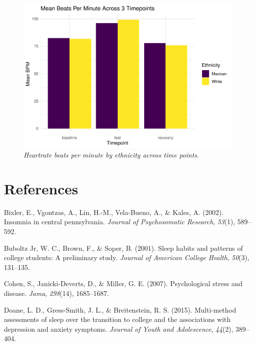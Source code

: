 \documentclass[
  man, fleqn, noextraspace]{apa6}
\begin{document}
\begin{figure}
\centering
\includegraphics{PAPAJA_Final_class_project_files/figure-latex/unnamed-chunk-3-1.pdf}
\caption{\label{fig:unnamed-chunk-3}\emph{Heartrate beats per minute by ethnicity across time points.}}
\end{figure}

\hypertarget{references}{%
\section{References}\label{references}}

\begingroup
\setlength{\parindent}{-0.5in}
\setlength{\leftskip}{0.5in}

\hypertarget{refs}{}
\leavevmode\hypertarget{ref-bixler2002insomnia}{}%
Bixler, E., Vgontzas, A., Lin, H.-M., Vela-Bueno, A., \& Kales, A. (2002). Insomnia in central pennsylvania. \emph{Journal of Psychosomatic Research}, \emph{53}(1), 589--592.

\leavevmode\hypertarget{ref-buboltz2001sleep}{}%
Buboltz Jr, W. C., Brown, F., \& Soper, B. (2001). Sleep habits and patterns of college students: A preliminary study. \emph{Journal of American College Health}, \emph{50}(3), 131--135.

\leavevmode\hypertarget{ref-cohen2007_psych}{}%
Cohen, S., Janicki-Deverts, D., \& Miller, G. E. (2007). Psychological stress and disease. \emph{Jama}, \emph{298}(14), 1685--1687.

\leavevmode\hypertarget{ref-doane2015multi}{}%
Doane, L. D., Gress-Smith, J. L., \& Breitenstein, R. S. (2015). Multi-method assessments of sleep over the transition to college and the associations with depression and anxiety symptoms. \emph{Journal of Youth and Adolescence}, \emph{44}(2), 389--404.
\end{document}
